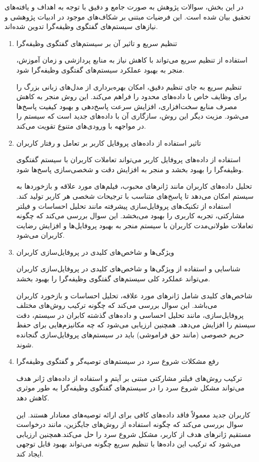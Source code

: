 در این بخش، سوالات پژوهش به صورت جامع و دقیق با توجه به اهداف و یافته‌های تحقیق بیان شده است. این فرضیات مبتنی بر شکاف‌های موجود در ادبیات پژوهشی و نیازهای سیستم‌های گفتگوی وظیفه‌گرا تدوین شده‌اند.

\begin{enumerate}
\item
تنظیم سریع و تاثیر آن بر سیستم‌های گفتگوی وظیفه‌گرا

استفاده از تنظیم سریع می‌تواند با کاهش نیاز به منابع پردازشی و زمان آموزش، منجر به بهبود عملکرد سیستم‌های گفتگوی وظیفه‌گرا شود.

تنظیم سریع به جای تنظیم دقیق، امکان بهره‌برداری از مدل‌های زبانی بزرگ را برای وظایف خاص با داده‌های محدود را فراهم می‌کند. این روش منجر به کاهش مصرف منابع سخت‌افزاری، افزایش سرعت پاسخ‌دهی و بهبود کیفیت پاسخ‌ها می‌شود. مزیت دیگر این روش، سازگاری آن با داده‌های جدید است که سیستم را در مواجهه با ورودی‌های متنوع تقویت می‌کند.


\item
تاثیر استفاده از داده‌های پروفایل کاربر بر تعامل و رفتار کاربران

استفاده از داده‌های پروفایل کاربر می‌تواند تعاملات کاربران با سیستم گفتگوی وظیفه‌گرا را بهبود بخشد و منجر به افزایش دقت و شخصی‌سازی پاسخ‌ها شود.

تحلیل داده‌های کاربران مانند ژانرهای محبوب، فیلم‌های مورد علاقه و بازخوردها به سیستم امکان می‌دهد تا پاسخ‌های متناسب با ترجیحات شخصی هر کاربر تولید کند. استفاده از تکنیک‌های پروفایل‌سازی پیشرفته مانند تحلیل احساسات و فیلتر مشارکتی، تجربه کاربری را بهبود می‌بخشد. این سوال بررسی می‌کند که چگونه تعاملات طولانی‌مدت کاربران با سیستم منجر به بهبود پروفایل‌ها و افزایش رضایت کاربران می‌شود.

\item
ویژگی‌ها و شاخص‌های کلیدی در پروفایل‌سازی کاربران

شناسایی و استفاده از ویژگی‌ها و شاخص‌های کلیدی در پروفایل‌سازی کاربران می‌تواند عملکرد کلی سیستم‌های گفتگوی وظیفه‌گرا را بهبود بخشد.

شاخص‌های کلیدی شامل ژانرهای مورد علاقه، تحلیل احساسات و بازخورد کاربران می‌باشد. این سوال بررسی می‌کند که چگونه ترکیب روش‌های مختلف پروفایل‌سازی، مانند تحلیل احساسی و داده‌های گذشته کابران در سیستم، دقت سیستم را افزایش می‌دهد. همچنین ارزیابی می‌شود که چه مکانیزم‌هایی برای حفظ حریم خصوصی (مانند حق فراموشی) باید در سیستم‌های پروفایل‌سازی گنجانده شوند.


\item
رفع مشکلات شروع سرد در سیستم‌های توصیه‌گر و گفتگوی وظیفه‌گرا

ترکیب روش‌های فیلتر مشارکتی مبتنی بر آیتم و استفاده از داده‌های ژانر هدف می‌تواند مشکل شروع سرد را در سیستم‌های گفتگوی وظیفه‌گرا به طور موثری کاهش دهد.

کاربران جدید معمولاً فاقد داده‌های کافی برای ارائه توصیه‌های معنادار هستند. این سوال بررسی می‌کند که چگونه استفاده از روش‌های جایگزین، مانند درخواست مستقیم ژانرهای هدف از کاربر، مشکل شروع سرد را حل می‌کند.همچنین ارزیابی می‌شود که ترکیب این داده‌ها با تنظیم سریع چگونه می‌تواند بهبود قابل توجهی ایجاد کند.

\end{enumerate}


